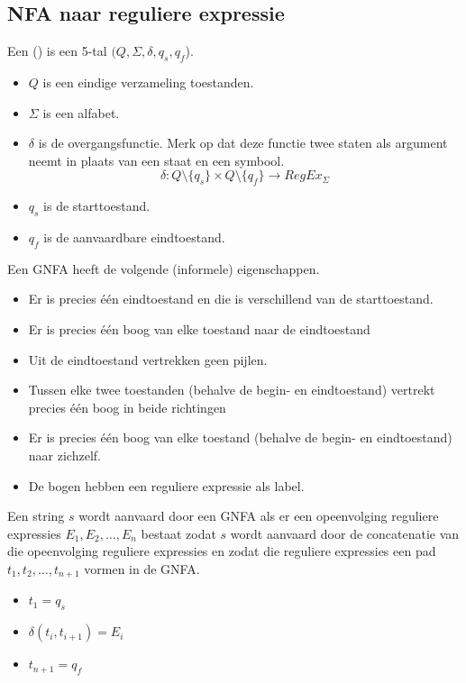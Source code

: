 \documentclass[main.tex]{subfiles}
\begin{document}
\subsection{NFA naar reguliere expressie}
\begin{de}
  Een  () is een 5-tal $(Q,\Sigma,\delta,q_{s},q_{f}$).
  \begin{itemize}
  \item $Q$ is een eindige verzameling toestanden.
  \item $\Sigma$ is een alfabet.
  \item $\delta$ is de overgangsfunctie.
  Merk op dat deze functie twee staten als argument neemt in plaats van een staat en een symbool.
    \[
    \delta: Q\setminus\{q_{s}\} \times Q\setminus\{q_{f}\} \rightarrow RegEx_{\Sigma}
    \]
  \item $q_{s}$ is de starttoestand.
  \item $q_{f}$ is de aanvaardbare eindtoestand.
  \end{itemize}
\end{de}
\begin{opm}
  Een GNFA heeft de volgende (informele) eigenschappen.
  \begin{itemize}
  \item Er is precies \'e\'en eindtoestand en die is verschillend van de starttoestand.
  \item Er is precies \'e\'en boog van elke toestand naar de eindtoestand
  \item Uit de eindtoestand vertrekken geen pijlen.
  \item Tussen elke twee toestanden (behalve de begin- en eindtoestand) vertrekt precies \'e\'en boog in beide richtingen
  \item Er is precies \'e\'en boog van elke toestand (behalve de begin- en eindtoestand) naar zichzelf.
  \item De bogen hebben een reguliere expressie als label.
  \end{itemize}
\end{opm} 

\begin{de}
  Een string $s$ wordt aanvaard door een GNFA als er een opeenvolging reguliere expressies $E_{1},E_{2},\dotsc,E_{n}$ bestaat zodat $s$ wordt aanvaard door de concatenatie van die opeenvolging reguliere expressies en zodat die reguliere expressies een pad $t_{1},t_{2},\dotsc,t_{n+1}$ vormen in de GNFA. 
  \begin{itemize}
  \item $t_{1} = q_{s}$
  \item $\delta(t_{i},t_{i+1}) = E_{i}$
  \item $t_{n+1} = q_{f}$
  \end{itemize}
\end{de}
\end{document}
